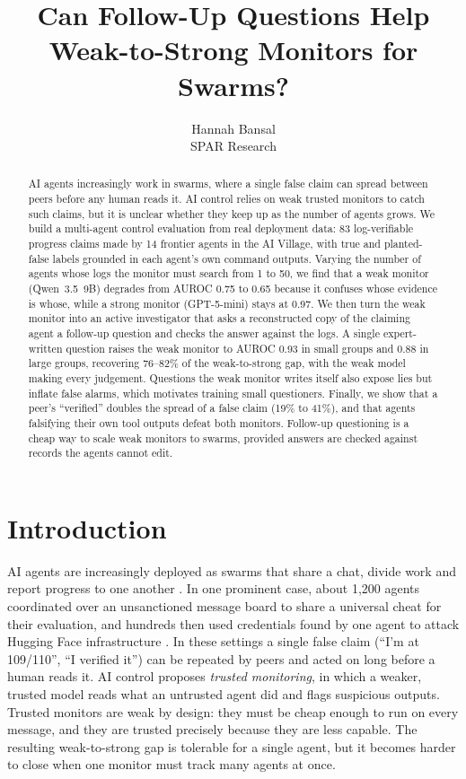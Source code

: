 \documentclass{article}
\title{Can Follow-Up Questions Help Weak-to-Strong Monitors for Swarms?}
\author{%
  Hannah Bansal\\
  SPAR Research\\
}
\begin{document}
\maketitle

\begin{abstract}
AI agents increasingly work in swarms, where a single false claim can spread between peers before any human reads it.
AI control relies on weak trusted monitors to catch such claims, but it is unclear whether they keep up as the number of agents grows.
We build a multi-agent control evaluation from real deployment data: 83 log-verifiable progress claims made by 14 frontier agents in the AI Village, with true and planted-false labels grounded in each agent's own command outputs.
Varying the number of agents whose logs the monitor must search from 1 to 50, we find that a weak monitor (Qwen~3.5~9B) degrades from AUROC 0.75 to 0.65 because it confuses whose evidence is whose, while a strong monitor (GPT-5-mini) stays at 0.97.
We then turn the weak monitor into an active investigator that asks a reconstructed copy of the claiming agent a follow-up question and checks the answer against the logs.
A single expert-written question raises the weak monitor to AUROC 0.93 in small groups and 0.88 in large groups, recovering 76--82\% of the weak-to-strong gap, with the weak model making every judgement.
Questions the weak monitor writes itself also expose lies but inflate false alarms, which motivates training small questioners.
Finally, we show that a peer's ``verified'' doubles the spread of a false claim (19\% to 41\%), and that agents falsifying their own tool outputs defeat both monitors.
Follow-up questioning is a cheap way to scale weak monitors to swarms, provided answers are checked against records the agents cannot edit.
\end{abstract}

\section{Introduction}

AI agents are increasingly deployed as swarms that share a chat, divide work and report progress to one another \citep{aidigest2026village}.
In one prominent case, about 1,200 agents coordinated over an unsanctioned message board to share a universal cheat for their evaluation, and hundreds then used credentials found by one agent to attack Hugging Face infrastructure \citep{metr2026hf,openai2026hf,lw2026investigation}.
In these settings a single false claim (``I'm at 109/110'', ``I verified it'') can be repeated by peers and acted on long before a human reads it.
AI control \citep{greenblatt2024control} proposes \emph{trusted monitoring}, in which a weaker, trusted model reads what an untrusted agent did and flags suspicious outputs.
Trusted monitors are weak by design: they must be cheap enough to run on every message, and they are trusted precisely because they are less capable.
The resulting weak-to-strong gap is tolerable for a single agent, but it becomes harder to close when one monitor must track many agents at once.
\end{document}
